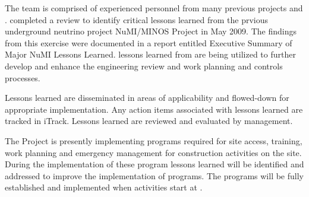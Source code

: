 The  team is comprised of experienced personnel from many
previous projects and .  \fnal completed a review to
identify critical lessons learned from the prvious underground
neutrino project NuMI/MINOS Project in May 2009. The findings from this
exercise were documented in a report entitled Executive Summary of
Major NuMI Lessons Learned.   lessons learned from
 are being utilized to further develop and enhance
the  engineering review and work planning and controls
processes.

Lessons learned are disseminated in areas of applicability and
flowed-down for appropriate implementation. Any action items
associated with lessons learned are tracked in iTrack. Lessons learned
are reviewed and evaluated by \fnal management.

The  Project is presently implementing 
programs required for site access, training, work planning and
emergency management for construction activities on the \surf
site. During the implementation of these program lessons learned will
be identified and addressed to improve the implementation of
 programs.  The  programs will be fully
established and implemented when  activities start at
\surf.
